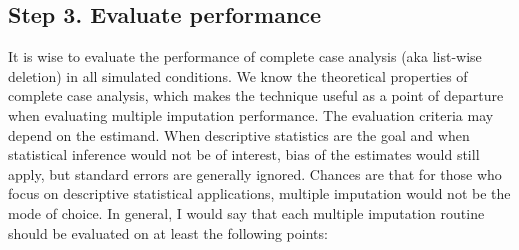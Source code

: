 \documentclass[
]{article}
\begin{document}
\hypertarget{step-3.-evaluate-performance}{%
\subsection{Step 3. Evaluate
performance}\label{step-3.-evaluate-performance}}

It is wise to evaluate the performance of complete case analysis (aka
list-wise deletion) in all simulated conditions. We know the theoretical
properties of complete case analysis, which makes the technique useful
as a point of departure when evaluating multiple imputation performance.
The evaluation criteria may depend on the estimand. When descriptive
statistics are the goal and when statistical inference would not be of
interest, bias of the estimates would still apply, but standard errors
are generally ignored. Chances are that for those who focus on
descriptive statistical applications, multiple imputation would not be
the mode of choice. In general, I would say that each multiple
imputation routine should be evaluated on at least the following points:
\end{document}
